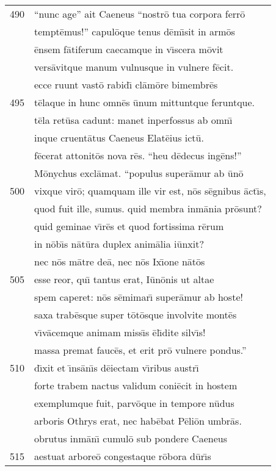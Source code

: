 \documentclass[paper=6in:9in,pagesize=pdftex,
               headinclude=on,footinclude=on,12pt]{scrbook}
\begin{document}
\begin{longtable}[p]{ r l }
490 & ``nunc age'' ait Caeneus ``nostr\=o tua corpora ferr\=o\\ 
 & tempt\=emus!'' capul\=oque tenus d\=em\={\i}sit in arm\=os\\ 
 & \=ensem f\=atiferum caecamque in v\={\i}scera m\=ovit\\ 
 & vers\=avitque manum vulnusque in vulnere f\=ecit.\\ 
 & ecce ruunt vast\=o rabid\={\i} cl\=am\=ore bimembr\=es\\ 
495 & t\=elaque in hunc omn\=es \=unum mittuntque feruntque.\\ 
 & t\=ela ret\=usa cadunt: manet inperfossus ab omn\={\i}\\ 
 & inque cruent\=atus Caeneus Elat\=eius ict\=u.\\ 
 & f\=ecerat attonit\=os nova r\=es. ``heu d\=edecus ing\=ens!''\\ 
 & M\=onychus excl\=amat. ``populus super\=amur ab \=un\=o\\ 
500 & vixque vir\=o; quamquam ille vir est, n\=os s\=egnibus \=act\={\i}s,\\ 
 & quod fuit ille, sumus. quid membra inm\=ania pr\=osunt?\\ 
 & quid geminae v\={\i}r\=es et quod fortissima r\=erum\\ 
 & in n\=ob\={\i}s n\=at\=ura duplex anim\=alia i\=unxit?\\ 
 & nec n\=os m\=atre de\=a, nec n\=os Ix\={\i}one n\=at\=os\\ 
505 & esse reor, qu\={\i} tantus erat, I\=un\=onis ut altae\\ 
 & spem caperet: n\=os s\=emimar\={\i} super\=amur ab hoste!\\ 
 & saxa trab\=esque super t\=ot\=osque involvite mont\=es\\ 
 & v\={\i}v\=acemque animam miss\={\i}s \=el\={\i}dite silv\={\i}s!\\ 
 & massa premat fauc\=es, et erit pr\=o vulnere pondus.''\\ 
510 & d\={\i}xit et \={\i}ns\=an\={\i}s d\=eiectam v\={\i}ribus austr\={\i}\\ 
 & forte trabem nactus validum coni\=ecit in hostem\\ 
 & exemplumque fuit, parv\=oque in tempore n\=udus\\ 
 & arboris Othrys erat, nec hab\=ebat P\=eli\=on umbr\=as.\\ 
 & obrutus inm\=an\={\i} cumul\=o sub pondere Caeneus\\ 
515 & aestuat arbore\=o congestaque r\=obora d\=ur\={\i}s\\ 

\end{longtable}
\end{document}
